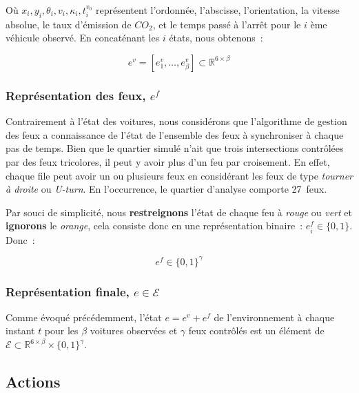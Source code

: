 \documentclass[11pt]{article}
\begin{document}
Où \(x_i, y_i, \theta_i, v_i, \kappa_i, t^{v_0}_i\) représentent l'ordonnée, l'abscisse, l'orientation, la vitesse absolue, le taux d'émission de \(CO_2\), et le temps passé à l'arrêt pour le \(i\) ème véhicule observé. En concaténant les \(i\) états, nous obtenons :

\begin{latex}
\begin{equation}
    e^v = [e^v_1, …, e^v_\beta] \subset \mathbb{R}^{6\times\beta}
\end{equation}
\end{latex}

\subsubsection{Représentation des feux, \(e^f\)}
\label{sec:org21f6848}

Contrairement à l'état des voitures, nous considérons que l'algorithme de gestion des feux a connaissance de l'état de l'ensemble des feux à synchroniser à chaque pas de temps. Bien que le quartier simulé n'ait que trois intersections contrôlées par des feux tricolores, il peut y avoir plus d'un feu par croisement. En effet, chaque file peut avoir un ou plusieurs feux en considérant les feux de type \emph{tourner à droite} ou \emph{U-turn}. En l'occurrence, le quartier d'analyse comporte 27 feux.

Par souci de simplicité, nous \textbf{restreignons} l'état de chaque feu à \emph{rouge} ou \emph{vert} et \textbf{ignorons} le \emph{orange}, cela consiste donc en une représentation binaire : \(e^f_i \in \{0,1\}\). Donc :

\begin{latex}
\begin{equation}
    e^f \in \{0,1\}^\gamma
\end{equation}
\end{latex}

\subsubsection{Représentation finale, \(e\in\mathcal{E}\)}
\label{sec:org48a6b6f}

Comme évoqué précédemment, l'état \(e = e^v + e^f\) de l'environnement à chaque instant \(t\) pour les \(\beta\) voitures observées et \(\gamma\) feux contrôlés est un élément de \(\mathcal{E}\subset \mathbb{R}^{6\times\beta}\times\{0,1\}^\gamma\).

\subsection{Actions}
\label{sec:org4c67f13}
\end{document}
